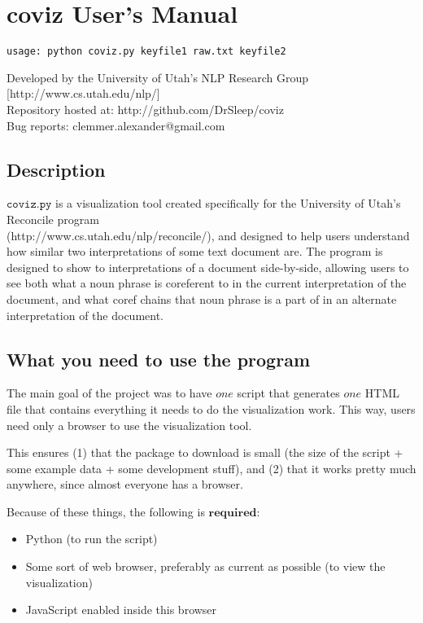 \documentclass[a4paper]{article}
\begin{document}
\section*{coviz User's Manual}
\begin{verbatim}
usage: python coviz.py keyfile1 raw.txt keyfile2
\end{verbatim}

\noindent Developed by the University of Utah's NLP Research Group [http://www.cs.utah.edu/nlp/] \\
\noindent Repository hosted at: http://github.com/DrSleep/coviz \\
\noindent Bug reports: clemmer.alexander@gmail.com

\subsection*{Description}
$\texttt{coviz.py}$ is a visualization tool created specifically for the University of Utah's Reconcile program \\
(http://www.cs.utah.edu/nlp/reconcile/), and designed to help users understand how similar two interpretations of some text document are. The program is designed to show to interpretations of a document side-by-side, allowing users to see both what a noun phrase is coreferent to in the current interpretation of the document, and what coref chains that noun phrase is a part of in an alternate interpretation of the document.

\subsection*{What you need to use the program}

The main goal of the project was to have $\textit{one}$ script that generates $\textit{one}$ HTML file that contains everything it needs to do the visualization work. This way, users need only a browser to use the visualization tool.

This ensures (1) that the package to download is small (the size of the script + some example data + some development stuff), and (2) that it works pretty much anywhere, since almost everyone has a browser.

Because of these things, the following is $\textbf{required}$:

\begin{itemize}
\item Python (to run the script)
\item Some sort of web browser, preferably as current as possible (to view the visualization)
\item JavaScript enabled inside this browser
\end{itemize}
\end{document}
